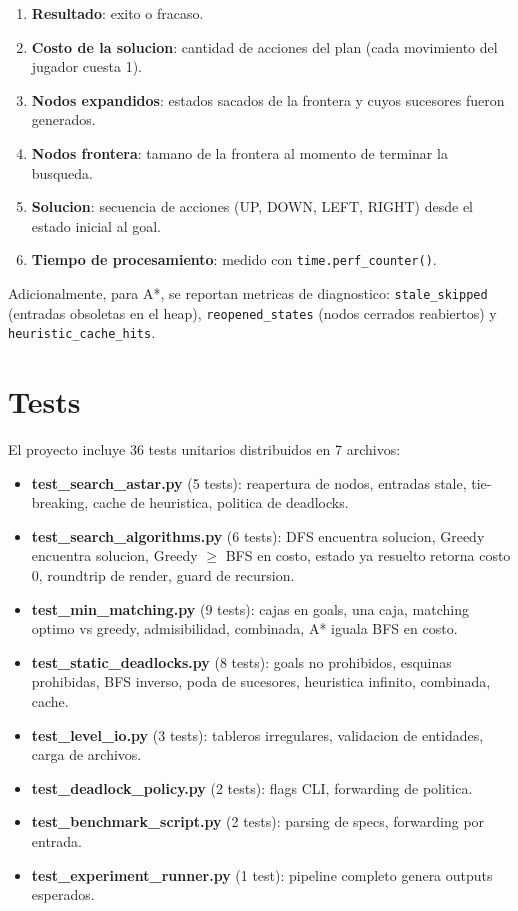 \documentclass[12pt, a4paper]{article}
\begin{document}
\begin{enumerate}
  \item \textbf{Resultado}: exito o fracaso.
  \item \textbf{Costo de la solucion}: cantidad de acciones del plan (cada movimiento del jugador cuesta 1).
  \item \textbf{Nodos expandidos}: estados sacados de la frontera y cuyos sucesores fueron generados.
  \item \textbf{Nodos frontera}: tamano de la frontera al momento de terminar la busqueda.
  \item \textbf{Solucion}: secuencia de acciones (UP, DOWN, LEFT, RIGHT) desde el estado inicial al goal.
  \item \textbf{Tiempo de procesamiento}: medido con \texttt{time.perf\_counter()}.
\end{enumerate}

Adicionalmente, para A*, se reportan metricas de diagnostico: \texttt{stale\_skipped} (entradas obsoletas en el heap), \texttt{reopened\_states} (nodos cerrados reabiertos) y \texttt{heuristic\_cache\_hits}.

\section{Tests}

El proyecto incluye 36 tests unitarios distribuidos en 7 archivos:

\begin{itemize}
  \item \textbf{test\_search\_astar.py} (5 tests): reapertura de nodos, entradas stale, tie-breaking, cache de heuristica, politica de deadlocks.
  \item \textbf{test\_search\_algorithms.py} (6 tests): DFS encuentra solucion, Greedy encuentra solucion, Greedy $\geq$ BFS en costo, estado ya resuelto retorna costo 0, roundtrip de render, guard de recursion.
  \item \textbf{test\_min\_matching.py} (9 tests): cajas en goals, una caja, matching optimo vs greedy, admisibilidad, combinada, A* iguala BFS en costo.
  \item \textbf{test\_static\_deadlocks.py} (8 tests): goals no prohibidos, esquinas prohibidas, BFS inverso, poda de sucesores, heuristica infinito, combinada, cache.
  \item \textbf{test\_level\_io.py} (3 tests): tableros irregulares, validacion de entidades, carga de archivos.
  \item \textbf{test\_deadlock\_policy.py} (2 tests): flags CLI, forwarding de politica.
  \item \textbf{test\_benchmark\_script.py} (2 tests): parsing de specs, forwarding por entrada.
  \item \textbf{test\_experiment\_runner.py} (1 test): pipeline completo genera outputs esperados.
\end{itemize}
\end{document}
